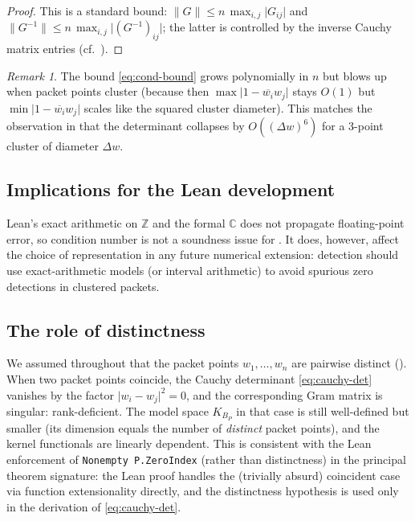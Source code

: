 \documentclass[12pt]{article}
\theoremstyle{definition}
\theoremstyle{remark}
\newtheorem{remark}[theorem]{Remark}
\newcommand{\C}{\mathbb{C}}
\newcommand{\Z}{\mathbb{Z}}
\newcommand{\KBP}{K_{B_{P}}}
\newcommand{\norm}[1]{\lVert #1 \rVert}
\newcommand{\abs}[1]{\lvert #1 \rvert}
\newcommand{\conj}[1]{\overline{#1}}
\begin{document}
\begin{proof}
This is a standard bound: $\norm{G}\le n\,\max_{i,j}\abs{G_{ij}}$ and
$\norm{G^{-1}}\le n\,\max_{i,j}\abs{(G^{-1})_{ij}}$; the latter is
controlled by the inverse Cauchy matrix entries (cf.~\cite[\S0.9.12]{HornJohnson}).
\end{proof}

\begin{remark}\label{rem:conditioning}
The bound \eqref{eq:cond-bound} grows polynomially in $n$ but blows up
when packet points cluster (because then $\max\abs{1-\conj{w_{i}}w_{j}}$
stays $O(1)$ but $\min\abs{1-\conj{w_{i}}w_{j}}$ scales like the squared
cluster diameter). This matches the observation in 
that the determinant collapses by $O((\Delta w)^{6})$ for a 3-point
cluster of diameter $\Delta w$.
\end{remark}

\subsection{Implications for the Lean development}

Lean's exact arithmetic on $\Z$ and the formal $\C$ does not propagate
floating-point error, so condition number is not a soundness issue for
. It does, however, affect the choice of
representation in any future numerical extension: detection should
use exact-arithmetic models (or interval arithmetic) to avoid spurious
zero detections in clustered packets.

\subsection{The role of distinctness}

We assumed throughout that the packet points $w_{1},\dots,w_{n}$ are
pairwise distinct (). When two packet points coincide,
the Cauchy determinant \eqref{eq:cauchy-det} vanishes by the factor
$\abs{w_{i}-w_{j}}^{2}=0$, and the corresponding Gram matrix is
singular: rank-deficient. The model space $\KBP$ in that case is still
well-defined but smaller (its dimension equals the number of
\emph{distinct} packet points), and the kernel functionals are linearly
dependent. This is consistent with the Lean enforcement of
\texttt{Nonempty P.ZeroIndex} (rather than distinctness) in the
principal theorem signature: the Lean proof handles the (trivially
absurd) coincident case via function extensionality directly, and the
distinctness hypothesis is used only in the derivation of
\eqref{eq:cauchy-det}.
\end{document}
